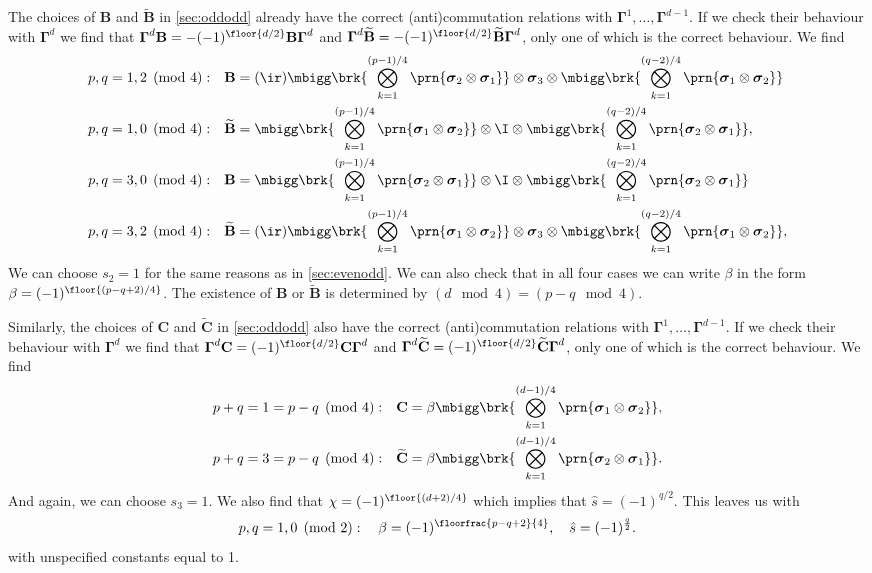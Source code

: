 \documentclass[11pt]{article}
\newcommand{\Gammab}{\boldsymbol{\Gamma}}
\newcommand{\B}{\mathbf{B}}
\renewcommand{\C}{\mathbf{C}}
\newcommand{\Bt}{\widetilde{\mathbf{B}}}
\newcommand{\Ct}{\widetilde{\mathbf{C}}}
\newcommand{\sigmab}{\boldsymbol{\sigma}}
\begin{document}
The choices of $\B$ and $\Bt$ in \cref{sec:oddodd} already have the correct (anti)commutation relations with $\Gammab^1, \ldots, \Gammab^{d-1}$.
If we check their behaviour with $\Gammab^d$ we find that $\Gammab^d \B = -(-1)^{\floor{d/2}}\B \Gammab^d$ and $\Gammab^d \Bt = -(-1)^{\floor{d/2}}\Bt \Gammab^d$, only one of which is the correct behaviour.
We find
%
\begin{equation*}
\begin{aligned}
  p, q &= 1, 2 \pmod 4: &
  \B &= (\ir)
        \mbigg\brk{\bigotimes_{k=1}^{(p-1)/4} \prn{\sigmab_2 \otimes \sigmab_1}} \otimes
        \sigmab_3 \otimes
        \mbigg\brk{\bigotimes_{k=1}^{(q-2)/4} \prn{\sigmab_1 \otimes \sigmab_2}} \\
  p, q &= 1, 0 \pmod 4: &
  \Bt &=
        \mbigg\brk{\bigotimes_{k=1}^{(p-1)/4} \prn{\sigmab_1 \otimes \sigmab_2}} \otimes
        \I \otimes
        \mbigg\brk{\bigotimes_{k=1}^{(q-2)/4} \prn{\sigmab_2 \otimes \sigmab_1}},
  \\
  p, q &= 3, 0 \pmod 4: &
  \B &=
        \mbigg\brk{\bigotimes_{k=1}^{(p-1)/4} \prn{\sigmab_2 \otimes \sigmab_1}} \otimes
        \I \otimes
        \mbigg\brk{\bigotimes_{k=1}^{(q-2)/4} \prn{\sigmab_2 \otimes \sigmab_1}} \\
  p, q &= 3, 2 \pmod 4: &
  \Bt &= (\ir)
        \mbigg\brk{\bigotimes_{k=1}^{(p-1)/4} \prn{\sigmab_1 \otimes \sigmab_2}} \otimes
        \sigmab_3 \otimes
        \mbigg\brk{\bigotimes_{k=1}^{(q-2)/4} \prn{\sigmab_1 \otimes \sigmab_2}},
\end{aligned}
\end{equation*}
%
We can choose $s_2 = 1$ for the same reasons as in \cref{sec:evenodd}.
We can also check that in all four cases we can write $\beta$ in the form $\beta = (-1)^{\floor{(p-q+2)/4}}$.
The existence of $\B$ or $\Bt$ is determined by $(d \mod 4) = (p-q \mod 4)$.

Similarly, the choices of $\C$ and $\Ct$ in \cref{sec:oddodd} also have the correct (anti)commutation relations with $\Gammab^1, \ldots, \Gammab^{d-1}$.
If we check their behaviour with $\Gammab^d$ we find that $\Gammab^d \C = (-1)^{\floor{d/2}}\C \Gammab^d$ and $\Gammab^d \Ct = (-1)^{\floor{d/2}} \Ct \Gammab^d$, only one of which is the correct behaviour.
We find
%
\begin{equation*}
\begin{aligned}
  p+q &= 1 = p-q \pmod 4: &
  \C &=  \beta
        \mbigg\brk{\bigotimes_{k=1}^{(d-1)/4} \prn{\sigmab_1 \otimes \sigmab_2}},
  \\
  p+q &= 3 = p-q \pmod 4: &
  \Ct &= \beta
        \mbigg\brk{\bigotimes_{k=1}^{(d-1)/4} \prn{\sigmab_2 \otimes \sigmab_1}}.
\end{aligned}
\end{equation*}
%
And again, we can choose $s_3 = 1$.
We also find that $\chi = (-1)^{\floor{(d+2)/4}}$ which implies that $\hat{s} = (-1)^{q/2}$.
This leaves us with
%
\begin{equation}\label{eq:constoddeven}
  p, q = 1,0 \pmod 2 : \quad
  \beta = (-1)^{\floorfrac{p-q+2}{4}}, \quad
  \hat{s} = (-1)^{\frac{q}{2}}.
\end{equation}
%
with unspecified constants equal to 1.
\end{document}
